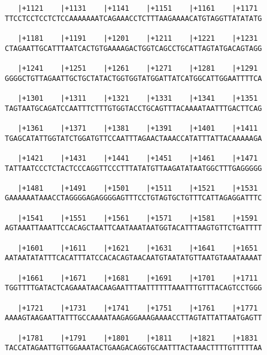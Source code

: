 \documentclass{article}
\begin{document}
\begin{Verbatim}
   |+1121    |+1131    |+1141    |+1151    |+1161    |+1171 
TTCCTCCTCCTCTCCAAAAAAATCAGAAACCTCTTTAAGAAAACATGTAGGTTATATATG
                                                            
   |+1181    |+1191    |+1201    |+1211    |+1221    |+1231 
CTAGAATTGCATTTAATCACTGTGAAAAGACTGGTCAGCCTGCATTAGTATGACAGTAGG
                                                            
   |+1241    |+1251    |+1261    |+1271    |+1281    |+1291 
GGGGCTGTTAGAATTGCTGCTATACTGGTGGTATGGATTATCATGGCATTGGAATTTTCA
                                                            
   |+1301    |+1311    |+1321    |+1331    |+1341    |+1351 
TAGTAATGCAGATCCAATTTCTTTGTGGTACCTGCAGTTTACAAAATAATTTGACTTCAG
                                                            
   |+1361    |+1371    |+1381    |+1391    |+1401    |+1411 
TGAGCATATTGGTATCTGGATGTTCCAATTTAGAACTAAACCATATTTATTACAAAAAGA
                                                            
   |+1421    |+1431    |+1441    |+1451    |+1461    |+1471 
TATTAATCCCTCTACTCCCAGGTTCCCTTTATATGTTAAGATATAATGGCTTTGAGGGGG
                                                            
   |+1481    |+1491    |+1501    |+1511    |+1521    |+1531 
GAAAAAATAAACCTAGGGGAGAGGGGAGTTTCCTGTAGTGCTGTTTCATTAGAGGATTTC
                                                            
   |+1541    |+1551    |+1561    |+1571    |+1581    |+1591 
AGTAAATTAAATTCCACAGCTAATTCAATAAATAATGGTACATTTAAGTGTTCTGATTTT
                                                            
   |+1601    |+1611    |+1621    |+1631    |+1641    |+1651 
AATAATATATTTCACATTTATCCACACAGTAACAATGTAATATGTTAATGTAAATAAAAT
                                                            
   |+1661    |+1671    |+1681    |+1691    |+1701    |+1711 
TGGTTTTGATACTCAGAAATAACAAGAATTTAATTTTTTAAATTTGTTTACAGTCCTGGG
                                                            
   |+1721    |+1731    |+1741    |+1751    |+1761    |+1771 
AAAAGTAAGAATTATTTGCCAAAATAAGAGGAAAGAAAACCTTAGTATTATTAATGAGTT
                                                            
   |+1781    |+1791    |+1801    |+1811    |+1821    |+1831 
TACCATAGAATTGTTGGAAATACTGAAGACAGGTGCAATTTACTAAACTTTTGTTTTTAA
                                                            

\end{Verbatim}
\end{document}
